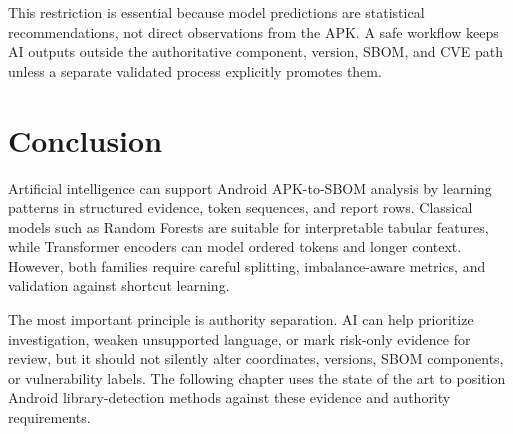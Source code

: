 This restriction is essential because model predictions are statistical
recommendations, not direct observations from the APK. A safe workflow keeps
AI outputs outside the authoritative component, version, SBOM, and CVE path
unless a separate validated process explicitly promotes them.

\section{Conclusion}

Artificial intelligence can support Android APK-to-SBOM analysis by learning
patterns in structured evidence, token sequences, and report rows. Classical
models such as Random Forests are suitable for interpretable tabular features,
while Transformer encoders can model ordered tokens and longer context.
However, both families require careful splitting, imbalance-aware metrics,
and validation against shortcut learning.

The most important principle is authority separation. AI can help prioritize
investigation, weaken unsupported language, or mark risk-only evidence for
review, but it should not silently alter coordinates, versions, SBOM
components, or vulnerability labels. The following chapter uses the state of
the art to position Android library-detection methods against these evidence
and authority requirements.
